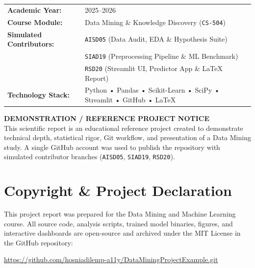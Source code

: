 \documentclass[11pt,a4paper,oneside]{report}
\begin{document}
\begin{titlepage}
\begin{center}
\begin{table}[H]
\centering
\small
\begin{tabular}{ll}
\toprule
\textbf{Academic Year:} & 2025--2026 \\
\textbf{Course Module:} & Data Mining \& Knowledge Discovery (\texttt{CS-504}) \\
\textbf{Simulated Contributors:} & \texttt{AISD05} (Data Audit, EDA \& Hypothesis Suite) \\
 & \texttt{SIAD19} (Preprocessing Pipeline \& ML Benchmark) \\
 & \texttt{RSD20} (Streamlit UI, Predictor App \& LaTeX Report) \\
\textbf{Technology Stack:} & Python • Pandas • Scikit-Learn • SciPy • Streamlit • GitHub • LaTeX \\
\bottomrule
\end{tabular}
\end{table}

\vfill

\begin{tcolorbox}[colback=yellow!10!white,colframe=orange!80!black,arc=4pt,boxrule=0.8pt]
\centering
\small \textbf{DEMONSTRATION / REFERENCE PROJECT NOTICE}\\
This scientific report is an educational reference project created to demonstrate technical depth, statistical rigor, Git workflow, and presentation of a Data Mining study. A single GitHub account was used to publish the repository with simulated contributor branches (\texttt{AISD05}, \texttt{SIAD19}, \texttt{RSD20}).
\end{tcolorbox}

\end{center}
\end{titlepage}

\newpage
{}

\section*{Copyright \& Project Declaration}
This project report was prepared for the Data Mining and Machine Learning course. All source code, analysis scripts, trained model binaries, figures, and interactive dashboards are open-source and archived under the MIT License in the GitHub repository:
\begin{center}
\url{https://github.com/hosniadilemp-a11y/DataMiningProjectExample.git}
\end{center}
\end{document}
